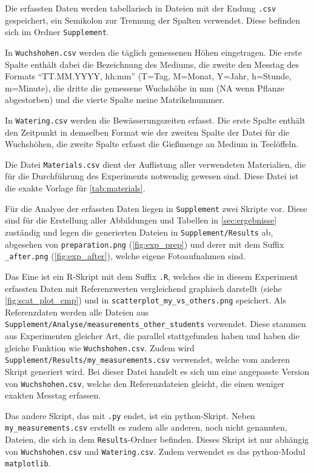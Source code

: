     \newpage
    Die erfassten Daten werden tabellarisch in Dateien mit der Endung \texttt{.csv} gespeichert, ein Semikolon zur Trennung der Spalten verwendet. Diese befinden sich im Ordner \texttt{Supplement}.

    In \texttt{Wuchshohen.csv} werden die täglich gemessenen Höhen eingetragen. Die erste Spalte enthält dabei die Bezeichnung des Mediums, die zweite den Messtag des Formats ``TT.MM.YYYY, hh:mm'' (T=Tag, M=Monat, Y=Jahr, h=Stunde, m=Minute), die dritte die gemessene Wuchshöhe in mm (NA wenn Pflanze abgestorben) und die vierte Spalte meine Matrikelnummer.

    In \texttt{Watering.csv} werden die Bewässerungszeiten erfasst. Die erste Spalte enthält den Zeitpunkt in demselben Format wie der zweiten Spalte der Datei für die Wuchshöhen, die zweite Spalte erfasst die Gießmenge an Medium in Teelöffeln.

    Die Datei \texttt{Materials.csv} dient der Auflistung aller verwendeten Materialien, die für die Durchführung des Experiments notwendig gewesen sind. Diese Datei ist die exakte Vorlage für \autoref{tab:materials}.

    Für die Analyse der erfassten Daten liegen in \texttt{Supplement} zwei Skripte vor. Diese sind für die Erstellung aller Abbildungen und Tabellen in \autoref{sec:ergebnisse} zuständig und legen die generierten Dateien in \texttt{Supplement/Results} ab, abgesehen von \texttt{preparation.png} (\autoref{fig:exp_prep}) und derer mit dem Suffix \texttt{\_after.png} (\autoref{fig:exp_after}), welche eigene Fotoaufnahmen sind.

    Das Eine ist ein R-Skript mit dem Suffix \texttt{.R}, welches die in diesem Experiment erfassten Daten mit Referenzwerten vergleichend graphisch darstellt (siehe \autoref{fig:scat_plot_cmp}) und in \texttt{scatterplot\_my\_vs\_others.png} speichert. Als Referenzdaten werden alle Dateien aus \texttt{Supplement/Analyse/measurements\_other\_students} verwendet. Diese stammen aus Experimenten gleicher Art, die parallel stattgefunden haben und haben die gleiche Funktion wie \texttt{Wuchshohen.csv}. Zudem wird \texttt{Supplement/Results/my\_measurements.csv} verwendet, welche vom anderen Skript generiert wird. Bei dieser Datei handelt es sich um eine angepasste Version von \texttt{Wuchshohen.csv}, welche den Referenzdateien gleicht, die einen weniger exakten Messtag erfassen.

    Das andere Skript, das mit \texttt{.py} endet, ist ein python-Skript. Neben \texttt{my\_measurements.csv} erstellt es zudem alle anderen, noch nicht genannten, Dateien, die sich in dem \texttt{Results}-Ordner befinden. Dieses Skript ist nur abhängig von \texttt{Wuchshohen.csv} und \texttt{Watering.csv}. Zudem verwendet es das python-Modul \texttt{matplotlib}.

